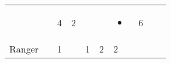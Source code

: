 \documentclass[12pt]{article}
\begin{document}
\begin{longtable}[]{@{}llllllllll@{}}
\begin{minipage}[t]{0.06\columnwidth}\raggedright\strut
\strut\end{minipage} &
\begin{minipage}[t]{0.06\columnwidth}\raggedright\strut
\strut\end{minipage} &
\begin{minipage}[t]{0.06\columnwidth}\raggedright\strut
4
\strut\end{minipage} &
\begin{minipage}[t]{0.06\columnwidth}\raggedright\strut
2
\strut\end{minipage} &
\begin{minipage}[t]{0.06\columnwidth}\raggedright\strut
\strut\end{minipage} &
\begin{minipage}[t]{0.06\columnwidth}\raggedright\strut
\strut\end{minipage} &
\begin{minipage}[t]{0.07\columnwidth}\raggedright\strut
\begin{itemize}
\item
\end{itemize}
\strut\end{minipage} &
\begin{minipage}[t]{0.08\columnwidth}\raggedright\strut
6
\strut\end{minipage}\tabularnewline
\begin{minipage}[t]{0.13\columnwidth}\raggedright\strut
Ranger
\strut\end{minipage} &
\begin{minipage}[t]{0.06\columnwidth}\raggedright\strut
\strut\end{minipage} &
\begin{minipage}[t]{0.06\columnwidth}\raggedright\strut
1
\strut\end{minipage} &
\begin{minipage}[t]{0.06\columnwidth}\raggedright\strut
\strut\end{minipage} &
\begin{minipage}[t]{0.06\columnwidth}\raggedright\strut
1
\strut\end{minipage} &
\begin{minipage}[t]{0.06\columnwidth}\raggedright\strut
2
\strut\end{minipage} &
\begin{minipage}[t]{0.06\columnwidth}\raggedright\strut
2
\strut\end{minipage} &
\begin{minipage}[t]{0.06\columnwidth}\raggedright\strut

\end{minipage}
\end{longtable}
\end{document}
